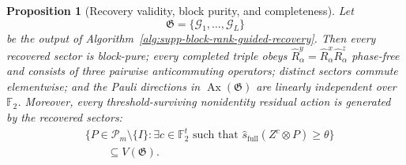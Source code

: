 \documentclass[
  aps,
  prx,
  reprint,
  superscriptaddress,
  amsmath,
  amssymb,
  nofootinbib,
  longbibliography
]{revtex4-2}
\newtheorem{proposition}[theorem]{Proposition}
\newcommand{\Pc}{\mathcal{P}}
\newcommand{\Fc}{\mathbb{F}_2}
\begin{document}
\begin{proposition}[Recovery validity, block purity, and completeness]
\label{prop:supp-block-triple-single-block}
Let
\begin{equation}
\mathfrak G
=
\{\mathcal G_1,\dots,\mathcal G_L\}
\end{equation}
be the output of Algorithm~\ref{alg:supp-block-rank-guided-recovery}.  Then
every recovered sector is block-pure; every completed triple obeys
$\hat R_\alpha^y=\hat R_\alpha^x\hat R_\alpha^z$ phase-free and consists
of three pairwise anticommuting operators; distinct sectors commute
elementwise; and the Pauli directions in $\operatorname{Ax}(\mathfrak G)$ are linearly
independent over $\Fc$.  Moreover, every threshold-surviving nonidentity
residual action is generated by the recovered sectors:
\begin{equation}
\begin{aligned}
&\{P\in\Pc_m\setminus\{I\}:\exists c\in\Fc^t
\text{ such that }
\hat s_{\mathrm{full}}(Z^c\otimes P)\ge\theta\}
\\
&\qquad\subseteq
V(\mathfrak G).
\end{aligned}
\label{eq:supp-threshold-span-completeness}
\end{equation}
\end{proposition}
\end{document}
